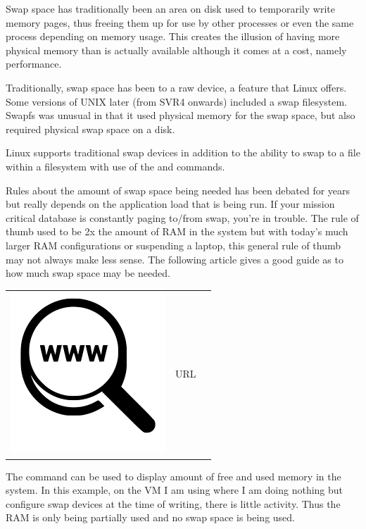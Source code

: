 Swap space has traditionally been an area on disk used to temporarily write memory pages, thus freeing them up for use by other processes or even the same process depending on memory usage. This creates the illusion of having more physical memory than is actually available although it comes at a cost, namely performance.

Traditionally, swap space has been to a raw device, a feature that Linux offers. Some versions of UNIX later (from SVR4 onwards) included a swap filesystem. Swapfs was unusual in that it used physical memory for the swap space, but also required physical swap space on a disk.

Linux supports traditional swap devices in addition to the ability to swap to a file within a filesystem with use of the  and  commands.

Rules about the amount of swap space being needed has been debated for years but really depends on the application load that is being run. If your mission critical database is constantly paging to/from swap, you're in trouble. The rule of thumb used to be 2x the amount of RAM in the system but with today's much larger RAM configurations or suspending a laptop, this general rule of thumb may not always make less sense. The following article gives a good guide as to how much swap space may be needed.

\begin{table}[h]
\begin{tabular}{lcl}
\parbox[r]{0.5in}{\includegraphics[scale=0.15]{figures/url.png}} & \parbox[l]{0.55in}{URL } & \parbox[l]{3in}{}
\end{tabular}
\end{table}

\noindent
The  command can be used to display amount of free and used memory in the system. In this example, on the VM I am using where I am doing nothing but configure swap devices at the time of writing, there is little activity. Thus the RAM is only being partially used and no swap space is being used.

